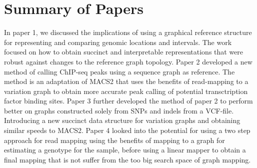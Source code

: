 \chapter{Summary of Papers}
In paper 1, we discussed the implications of using a graphical reference structure for representing and comparing genomic locations and intervals.
The work focused on how to obtain succinct and interpretable representations that were robust against changes to the reference graph topology. 
Paper 2 developed a new method of calling ChIP-seq peaks using a sequence graph as reference.
The method is an adaptation of MACS2 that uses the benefits of read-mapping to a variation graph to obtain more accurate peak calling of potential transctription factor binding sites. 
Paper 3 further developed the method of paper 2 to perform better on graphs constructed solely from SNPs and indels from a VCF-file. Introducing a new succinct data structure for variation graphs and obtaining similar speeds to MACS2.
Paper 4 looked into the potential for using a two step approach for read mapping using the benefits of mapping to a graph for estimating a genotype for the sample, before using a linear mapper to obtain a final mapping that is not suffer from the too big search space of graph mapping. 


